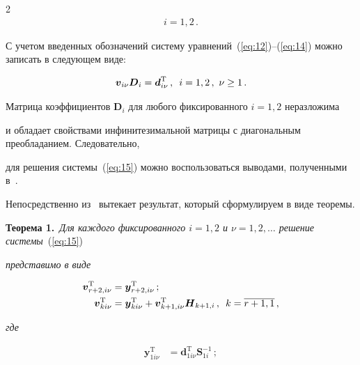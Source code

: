 \begin{multicols}{2}
{\begin{multline*}
i=1,2\,.

\end{multline*}}



С учетом введенных обозначений систему уравнений~(\ref{eq:12})--(\ref{eq:14}) можно записать в следующем виде:

\begin{equation}

\label{eq:15}

\boldsymbol{v}_{i\nu}\boldsymbol{D}_{i}=\boldsymbol{d}_{i\nu}^{\mathrm{T}}\,,\enskip i=1,2\,,\,\, \nu \geq 1\,.

\end{equation}



Матрица коэффициентов $\boldsymbol{D}_{i}$ для любого фиксированного $i=1,2$ неразложима 

и обладает  свойствами инфинитезимальной  матрицы с диагональным преобладанием. Следовательно, 

для решения системы~(\ref{eq:15}) можно воспользоваться выводами, полученными в~\cite{3mat}. 

Непосредственно из~\cite{3mat} вытекает  результат, который сформулируем в виде теоремы.



\medskip



\noindent

\textbf{Теорема 1.}\ \textit{Для каждого фиксированного $i=1,2$ и $\nu=1,2,\ldots$ решение системы}~(\ref{eq:15}) 

\textit{представимо в виде}

\begin{align*}

\boldsymbol{v}_{r+2,i\nu}^{\mathrm{T}}&=\boldsymbol{y}_{r+2,i\nu}^{\mathrm{T}}\,;\\

\boldsymbol{v}_{ki\nu}^{\mathrm{T}}&=\boldsymbol{y}_{ki\nu}^{\mathrm{T}}+

\boldsymbol{v}_{k+1,i\nu}^{\mathrm{T}}\boldsymbol{H}_{k+1,i}\,,\enskip k=\overline{r+1,1}\,,

\end{align*}

\textit{где}

\begin{align*}

\boldsymbol{y}_{1i\nu}^{\mathrm{T}}&=\boldsymbol{d}_{1i\nu}^{\mathrm{T}}\boldsymbol{S}_{1i}^{-1}\,;


\end{align*}
\end{multicols}
